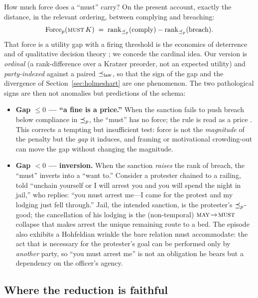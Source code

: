 How much force does a ``must'' carry? On the present account, exactly the distance, in
the relevant ordering, between complying and breaching:
\[
  \mathrm{Force}_p(\textsc{must}\,K)\;=\;\operatorname{rank}_{\preceq_{p}}(\text{comply}) - \operatorname{rank}_{\preceq_{p}}(\text{breach}).
\]
That force is a utility gap with a firing threshold is the economics of deterrence
 and of qualitative decision theory ; we
concede the cardinal idea. Our version is \emph{ordinal} (a rank-difference over a
Kratzer preorder, not an expected utility) and \emph{party-indexed} against a paired
$\preceq_{\mathrm{law}}$, so that the sign of the gap and the divergence of
Section~\ref{sec:holmeshart} are one phenomenon. The two pathological signs are then not
anomalies but predictions of the schema:
\begin{itemize}[noitemsep,topsep=2pt]
  \item \textbf{Gap $\le 0$ --- ``a fine is a price.''} When the sanction fails to push
  breach below compliance in $\preceq_{p}$, the ``must'' has no force; the rule is read as a
  price . This corrects a tempting but
  insufficient test: force is not the \emph{magnitude} of the penalty but the
  \emph{gap} it induces, and framing or motivational crowding-out can move the gap
  without changing the magnitude.
  \item \textbf{Gap $<0$ --- inversion.} When the sanction \emph{raises} the rank of
  breach, the ``must'' inverts into a ``want to.'' Consider a protester chained to a
  railing, told ``unchain yourself or I will arrest you and you will spend the night in
  jail,'' who replies: ``you must arrest me---I came for the protest and my lodging just
  fell through.'' Jail, the intended sanction, is the protester's $\preceq_{p}$-good; the
  cancellation of his lodging is the (non-temporal) $\textsc{may}\!\to\!\textsc{must}$ collapse that
  makes arrest the unique remaining route to a bed. The episode also exhibits a
  Hohfeldian wrinkle the bare relation must accommodate: the act that is necessary for
  the protester's goal can be performed only by \emph{another} party, so ``you must
  arrest me'' is not an obligation he bears but a dependency on the officer's agency.
\end{itemize}

\subsection{Where the reduction is faithful}
\label{sec:faithful}

